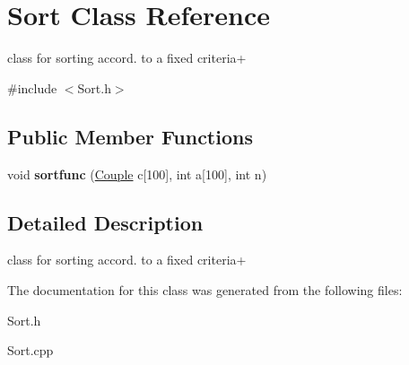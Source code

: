\hypertarget{classSort}{}\section{Sort Class Reference}
\label{classSort}


class for sorting accord. to a fixed criteria+  




{\ttfamily \#include $<$Sort.\+h$>$}

\subsection*{Public Member Functions}
\begin{DoxyCompactItemize}
\item 
void {\bfseries sortfunc} (\hyperlink{classCouple}{Couple} c\mbox{[}100\mbox{]}, int a\mbox{[}100\mbox{]}, int n)\hypertarget{classSort_aacbbf3790c196e6635dea189f6b955fd}{}\label{classSort_aacbbf3790c196e6635dea189f6b955fd}

\end{DoxyCompactItemize}


\subsection{Detailed Description}
class for sorting accord. to a fixed criteria+ 

The documentation for this class was generated from the following files\+:\begin{DoxyCompactItemize}
\item 
Sort.\+h\item 
Sort.\+cpp\end{DoxyCompactItemize}
